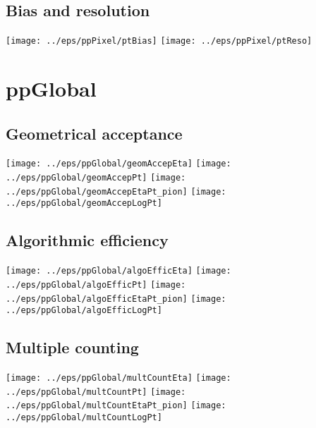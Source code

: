 \documentclass[landscape]{article}
\begin{document}
\subsection{Bias and resolution}
 \texttt{[image: ../eps/ppPixel/ptBias]}
 \texttt{[image: ../eps/ppPixel/ptReso]}
 \newpage
\section{ppGlobal}

\subsection{Geometrical acceptance}
 \texttt{[image: ../eps/ppGlobal/geomAccepEta]}
 \texttt{[image: ../eps/ppGlobal/geomAccepPt]}
 \texttt{[image: ../eps/ppGlobal/geomAccepEtaPt\_pion]}
 \texttt{[image: ../eps/ppGlobal/geomAccepLogPt]}
 \newpage
 
\subsection{Algorithmic efficiency}
 \texttt{[image: ../eps/ppGlobal/algoEfficEta]}
 \texttt{[image: ../eps/ppGlobal/algoEfficPt]}
 \texttt{[image: ../eps/ppGlobal/algoEfficEtaPt\_pion]}
 \texttt{[image: ../eps/ppGlobal/algoEfficLogPt]}
 \newpage

\subsection{Multiple counting}
 \texttt{[image: ../eps/ppGlobal/multCountEta]}
 \texttt{[image: ../eps/ppGlobal/multCountPt]}
 \texttt{[image: ../eps/ppGlobal/multCountEtaPt\_pion]}
 \texttt{[image: ../eps/ppGlobal/multCountLogPt]}
 \newpage
\end{document}
